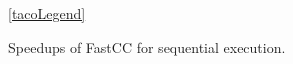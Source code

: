 \begin{figure}[t]
    \ref{tacoLegend}
    \centering
    

    



    \caption{Speedups of FastCC for sequential execution.}
    \label{fig:frostt_sequential}
    
\end{figure}

